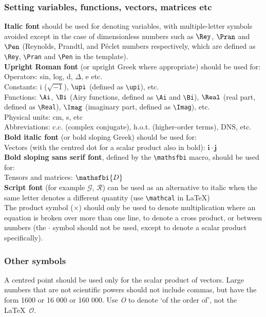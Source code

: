 \documentclass{jfm}
\begin{document}
\subsubsection{Setting variables, functions, vectors, matrices etc}
{\bf Italic font} should be used for denoting variables, with multiple-letter symbols avoided except in the case of dimensionless numbers such as $\Rey$, $\Pran$ and $\Pen$ (Reynolds, Prandtl, and P\'eclet numbers respectively, which are defined as \verb|\Rey|, \verb|\Pran| and \verb|\Pen| in the template).\\
{\bf Upright Roman font} (or upright Greek where appropriate) should be used for:\\
Operators: sin, log, d, $\Delta$, e etc.\\
Constants: i ($\sqrt{-1}$), $\upi$ (defined as \verb|\upi|), etc.\\
Functions: $\Ai$, $\Bi$ (Airy functions, defined as \verb|\Ai| and \verb|\Bi|), $\Real$ (real part, defined as \verb|\Real|), $\Imag$ (imaginary part, defined as \verb|\Imag|), etc.\\
Physical units: cm, s, etc\\
Abbreviations: c.c. (complex conjugate), h.o.t. (higher-order terms), DNS, etc.\\
{\bf Bold italic font} (or bold sloping Greek) should be used for:\\
Vectors (with the centred dot for a scalar product also in bold): $\boldsymbol{i \cdot j}$\\
{\bf Bold sloping sans serif font}, defined by the \verb|\mathsfbi| macro, should be used for:\\
Tensors and matrices: $\mathsfbi{D}$ \\
{\bf Script font} (for example $\mathcal{G}$, $\mathcal{R}$) can be used as an alternative to italic when the same letter denotes a different quantity (use \verb|\mathcal| in \LaTeX)\\
The product symbol ($\times$) should only be used to denote multiplication where an equation is broken over more than one line, to denote a cross product, or between numbers (the $\cdot$ symbol should not be used, except to denote a scalar product specifically).\\ 

\subsubsection{Other symbols}
A centred point should be used only for the scalar product of vectors.
Large numbers that are not scientific powers should not include commas, but have the
form 1600 or 16 000 or 160 000.
Use \textit{O} to denote `of the order of', not the \LaTeX\ $\mathcal{O}$.
\end{document}
